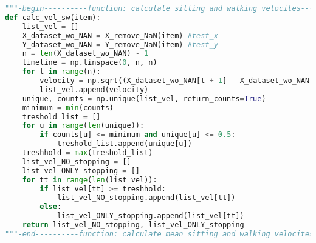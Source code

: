 \begin{lstlisting}[language=Python, basicstyle=\tiny, frame=single, keywordstyle=\color{teal}, commentstyle=\color{olive}, stringstyle=\color{red}]
"""-begin----------function: calculate sitting and walking velocites------"""
def calc_vel_sw(item):
    list_vel = []
    X_dataset_wo_NAN = X_remove_NaN(item) #test_x
    Y_dataset_wo_NAN = Y_remove_NaN(item) #test_y
    n = len(X_dataset_wo_NAN) - 1
    timeline = np.linspace(0, n, n)
    for t in range(n):
        velocity = np.sqrt((X_dataset_wo_NAN[t + 1] - X_dataset_wo_NAN[t]) ** 2 + (Y_dataset_wo_NAN[t + 1] - Y_dataset_wo_NAN[t]) ** 2)
        list_vel.append(velocity)
    unique, counts = np.unique(list_vel, return_counts=True)
    minimum = min(counts)
    treshold_list = []
    for u in range(len(unique)):
        if counts[u] <= minimum and unique[u] <= 0.5:
            treshold_list.append(unique[u])
    treshhold = max(treshold_list)
    list_vel_NO_stopping = []
    list_vel_ONLY_stopping = []
    for tt in range(len(list_vel)):
        if list_vel[tt] >= treshhold:
            list_vel_NO_stopping.append(list_vel[tt])
        else:
            list_vel_ONLY_stopping.append(list_vel[tt])
    return list_vel_NO_stopping, list_vel_ONLY_stopping
"""-end----------function: calculate mean sitting and walking velocites------"""


\end{lstlisting}
